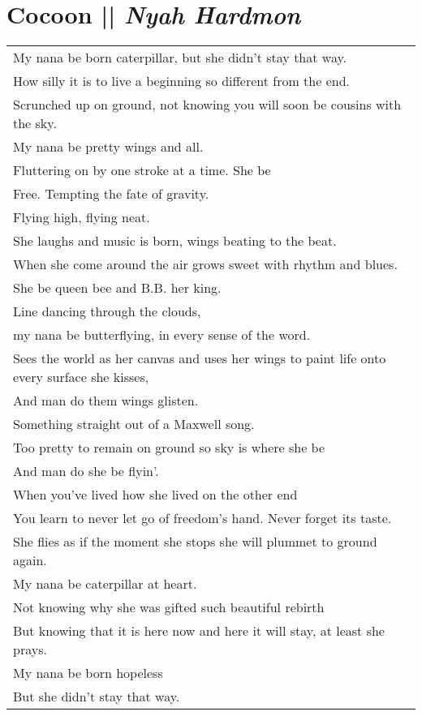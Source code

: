 \section[Cocoon]{Cocoon || \emph{Nyah Hardmon} \hspace*{\fill}  \thepage}
\vfill
\begin{center}
\begin{tabular}{l}
My nana be born caterpillar, but she didn’t stay that way.\\
How silly it is to live a beginning so different from the end.\\
Scrunched up on ground, not knowing you will soon be cousins with the sky.\\
My nana be pretty wings and all.\\
Fluttering on by one stroke at a time. She be\\
Free. Tempting the fate of gravity.\\
Flying high, flying neat.\\
She laughs and music is born, wings beating to the beat.\\
When she come around the air grows sweet with rhythm and blues.\\
She be queen bee and B.B. her king.\\
Line dancing through the clouds,\\
my nana be butterflying, in every sense of the word.\\
Sees the world as her canvas and uses her wings to paint life onto every surface she kisses,\\
And man do them wings glisten.\\
Something straight out of a Maxwell song.\\
Too pretty to remain on ground so sky is where she be\\
And man do she be flyin’.\\
When you’ve lived how she lived on the other end\\
You learn to never let go of freedom’s hand. Never forget its taste.\\
She flies as if the moment she stops she will plummet to ground again.\\
My nana be caterpillar at heart.\\
Not knowing why she was gifted such beautiful rebirth\\
But knowing that it is here now and here it will stay, at least she prays.\\
My nana be born hopeless\\
But she didn’t stay that way.
\end{tabular}
\end{center}
\vfill